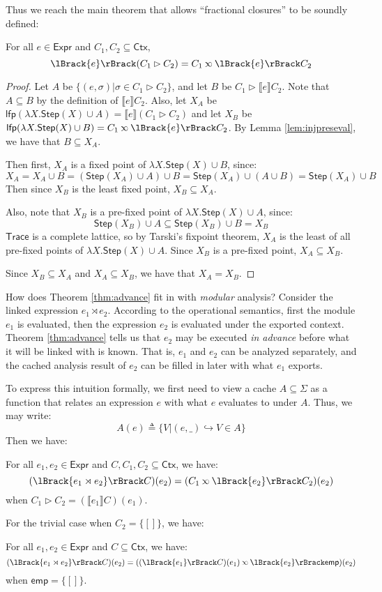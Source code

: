 \documentclass[acmsmall,screen,review]{acmart}\settopmatter{printfolios=true,printccs=false,printacmref=false}
\theoremstyle{acmdefinition}
\newcommand*{\Expr}{\mathsf{Expr}}
\newcommand*{\ctx}{\sigma}
\newcommand*{\Ctx}{\mathsf{Ctx}}
\newcommand*{\Trace}{\mathsf{Trace}}
\newcommand*{\lfp}{\mathsf{lfp}}
\newcommand*{\Step}{\mathsf{Step}}
\newcommand*{\semarrow}{\hookrightarrow}
\newcommand*{\semlink}{\mathbin{\rotatebox[origin=c]{180}{$\propto$}}}
\newcommand*{\link}[2]{{#1}\rtimes{#2}}
\newcommand*{\mt}{\mathsf{emp}}
\newcommand*{\sembracket}[1]{\lBrack{#1}\rBrack}
\begin{document}
Thus we reach the main theorem that allows ``fractional closures'' to be soundly defined:
\begin{theorem}[Advance]\label{thm:advance}
  For all $e\in\Expr$ and $C_1,C_2\subseteq\Ctx$,
  \[\sembracket{e}(C_1\rhd C_2)=C_1\semlink\sembracket{e}C_2\]
\end{theorem}
\begin{proof}
  Let $A$ be $\{(e,\ctx)|\ctx\in C_1\rhd C_2\}$, and let $B$ be $C_1\rhd\sembracket{e}C_2$.
  Note that $A\subseteq B$ by the definition of $\sembracket{e}C_2$.
  Also, let $X_A$ be $\lfp(\lambda X.\Step(X)\cup A)=\sembracket{e}(C_1\rhd C_2)$ and let $X_B$ be $\lfp(\lambda X.\Step(X)\cup B)=C_1\semlink\sembracket{e}C_2$.
  By Lemma \ref{lem:injpreseval}, we have that $B\subseteq X_A$.

  Then first, $X_A$ is a fixed point of $\lambda X.\Step(X)\cup B$, since:
  \[X_A=X_A\cup B=(\Step(X_A)\cup A)\cup B=\Step(X_A)\cup(A\cup B)=\Step(X_A)\cup B\]
  Then since $X_B$ is the least fixed point, $X_B\subseteq X_A$.

  Also, note that $X_B$ is a pre-fixed point of $\lambda X.\Step(X)\cup A$, since:
  \[\Step(X_B)\cup A\subseteq\Step(X_B)\cup B=X_B\]
  $\Trace$ is a complete lattice, so by Tarski's fixpoint theorem, $X_A$ is the least of all pre-fixed points of $\lambda X.\Step(X)\cup A$.
  Since $X_B$ is a pre-fixed point, $X_A\subseteq X_B$.

  Since $X_B\subseteq X_A$ and $X_A\subseteq X_B$, we have that $X_A=X_B$.
\end{proof}

How does Theorem \ref{thm:advance} fit in with \emph{modular} analysis?
Consider the linked expression $\link{e_1}{e_2}$.
According to the operational semantics, first the module $e_1$ is evaluated, then the expression $e_2$ is evaluated under the exported context.
Theorem \ref{thm:advance} tells us that $e_2$ may be executed \emph{in advance} before what it will be linked with is known.
That is, $e_1$ and $e_2$ can be analyzed separately, and the cached analysis result of $e_2$ can be filled in later with what $e_1$ exports.

To express this intuition formally, we first need to view a cache $A\subseteq\Sigma$ as a function that relates an expression $e$ with what $e$ evaluates to under $A$.
Thus, we may write:
\[A(e)\triangleq\{V|(e,\_)\semarrow V\in A\}\]
Then we have:
\begin{corollary} For all $e_1,e_2\in\Expr$ and $C,C_1,C_2\subseteq\Ctx$, we have:
  \[(\sembracket{\link{e_1}{e_2}}C)(e_2)=(C_1\semlink\sembracket{e_2}C_2)(e_2)\]
  when $C_1\rhd C_2=(\sembracket{e_1}C)(e_1)$.
\end{corollary}
For the trivial case when $C_2=\{[]\}$, we have:
\begin{corollary} For all $e_1,e_2\in\Expr$ and $C\subseteq\Ctx$, we have:
  \[(\sembracket{\link{e_1}{e_2}}C)(e_2)=((\sembracket{e_1}C)(e_1)\semlink\sembracket{e_2}\mt)(e_2)\]
  when $\mt=\{[]\}$.
\end{corollary}
\end{document}
